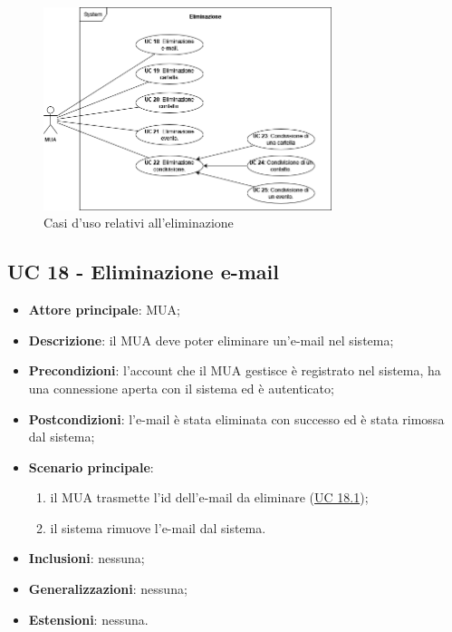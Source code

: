
\begin{figure}[H]
    \includegraphics[width=0.75\textwidth]{sections/uc_imgs/UC-eliminazione.png}
    \centering
    \caption{Casi d'uso relativi all'eliminazione}
\end{figure}

\subsection{UC 18 - Eliminazione e-mail} \label{sec:UC18}

    \begin{itemize}
        \item \textbf{Attore principale}: MUA;
        \item \textbf{Descrizione}: il MUA deve poter eliminare un'e-mail nel sistema;
        \item \textbf{Precondizioni}: l’account che il MUA gestisce è registrato nel sistema, ha una connessione aperta con il sistema ed è autenticato;
        \item \textbf{Postcondizioni}: l'e-mail è stata eliminata con successo ed è stata rimossa dal sistema;
        \item \textbf{Scenario principale}:
            \begin{enumerate}
                \item il MUA trasmette l'id dell'e-mail da eliminare (\hyperref[sec:UC18.1]{UC 18.1});
                \item il sistema rimuove l'e-mail dal sistema.
            \end{enumerate}
        \item \textbf{Inclusioni}: nessuna;
        \item \textbf{Generalizzazioni}: nessuna;
        \item \textbf{Estensioni}: nessuna.
    \end{itemize}

